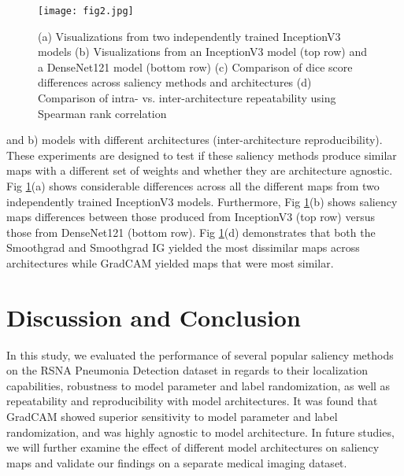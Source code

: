 \documentclass{midl} %
\begin{document}
\begin{figure}[H]
\centering\texttt{[image: fig2.jpg]}
\caption{(a) Visualizations from two independently trained InceptionV3 models (b) Visualizations from an InceptionV3 model (top row) and a DenseNet121 model (bottom row) (c) Comparison of dice score differences across saliency methods and architectures (d) Comparison of intra- vs. inter-architecture repeatability using Spearman rank correlation}
\label{fig:fig2}
\end{figure}

\noindent and b) models with different architectures (inter-architecture reproducibility). These experiments are designed to test if these saliency methods produce similar maps with a different set of weights and whether they are architecture agnostic. Fig \ref{fig:fig2}(a) shows considerable differences across all the different maps from two independently trained InceptionV3 models. Furthermore, Fig \ref{fig:fig2}(b) shows saliency maps differences between those produced from InceptionV3 (top row) versus those from DenseNet121 (bottom row). Fig \ref{fig:fig2}(d) demonstrates that both the Smoothgrad and Smoothgrad IG  yielded the most dissimilar maps across architectures while GradCAM yielded maps that were most similar.

\section{Discussion and Conclusion}
In this study, we evaluated the performance of several popular saliency methods on the RSNA Pneumonia Detection dataset in regards to their localization capabilities, robustness to model parameter and label randomization, as well as repeatability and reproducibility with model architectures.  It was found that GradCAM showed superior sensitivity to model parameter and label randomization, and was highly agnostic to model architecture. In future studies, we will further examine the effect of different model architectures on saliency maps and validate our findings on a separate medical imaging dataset.
\end{document}
